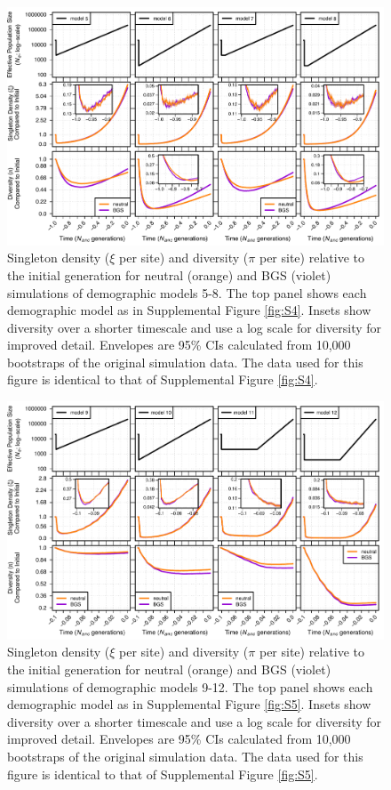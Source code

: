 \documentclass[9pt,twocolumn,twoside]{rilabRxiv}
\begin{document}
\begin{figure}[h!]
\includegraphics[width=0.8\linewidth]{figures/FigS7.pdf}
\caption{Singleton density ($\xi$ per site) and diversity ($\pi$ per site) relative to the initial generation for neutral (orange) and BGS (violet) simulations of demographic models 5-8.
The top panel shows each demographic model as in Supplemental Figure \ref{fig:S4}.
Insets show diversity over a shorter timescale and use a log scale for diversity for improved detail.
Envelopes are 95\% CIs calculated from 10,000 bootstraps of the original simulation data.
The data used for this figure is identical to that of Supplemental Figure \ref{fig:S4}.}
\label{fig:S7}
\end{figure}
\pagebreak

\begin{figure}[h!]
\includegraphics[width=0.8\linewidth]{figures/FigS8.pdf}
\caption{Singleton density ($\xi$ per site) and diversity ($\pi$ per site) relative to the initial generation for neutral (orange) and BGS (violet) simulations of demographic models 9-12.
The top panel shows each demographic model as in Supplemental Figure \ref{fig:S5}.
Insets show diversity over a shorter timescale and use a log scale for diversity for improved detail.
Envelopes are 95\% CIs calculated from 10,000 bootstraps of the original simulation data.
The data used for this figure is identical to that of Supplemental Figure \ref{fig:S5}.}
\label{fig:S8}
\end{figure}
\pagebreak
\end{document}
